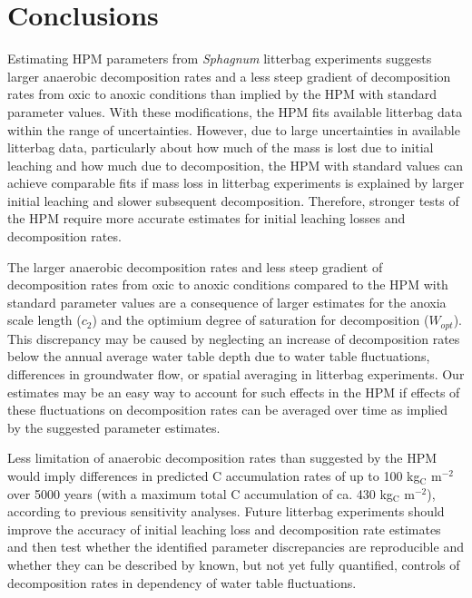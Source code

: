 \documentclass[
  12pt,
]{article}
\begin{document}
\hypertarget{conclusions}{%
\section{Conclusions}\label{conclusions}}

Estimating HPM parameters from \emph{Sphagnum} litterbag experiments suggests larger anaerobic decomposition rates and a less steep gradient of decomposition rates from oxic to anoxic conditions than implied by the HPM with standard parameter values. With these modifications, the HPM fits available litterbag data within the range of uncertainties. However, due to large uncertainties in available litterbag data, particularly about how much of the mass is lost due to initial leaching and how much due to decomposition, the HPM with standard values can achieve comparable fits if mass loss in litterbag experiments is explained by larger initial leaching and slower subsequent decomposition. Therefore, stronger tests of the HPM require more accurate estimates for initial leaching losses and decomposition rates.

The larger anaerobic decomposition rates and less steep gradient of decomposition rates from oxic to anoxic conditions compared to the HPM with standard parameter values are a consequence of larger estimates for the anoxia scale length (\(c_2\)) and the optimium degree of saturation for decomposition (\(W_{opt}\)). This discrepancy may be caused by neglecting an increase of decomposition rates below the annual average water table depth due to water table fluctuations, differences in groundwater flow, or spatial averaging in litterbag experiments. Our estimates may be an easy way to account for such effects in the HPM if effects of these fluctuations on decomposition rates can be averaged over time as implied by the suggested parameter estimates.

Less limitation of anaerobic decomposition rates than suggested by the HPM would imply differences in predicted C accumulation rates of up to 100 kg\(_\text{C}\) m\(^{-2}\) over 5000 years (with a maximum total C accumulation of ca. 430 kg\(_\text{C}\) m\(^{-2}\)), according to previous sensitivity analyses. Future litterbag experiments should improve the accuracy of initial leaching loss and decomposition rate estimates and then test whether the identified parameter discrepancies are reproducible and whether they can be described by known, but not yet fully quantified, controls of decomposition rates in dependency of water table fluctuations.
\end{document}
